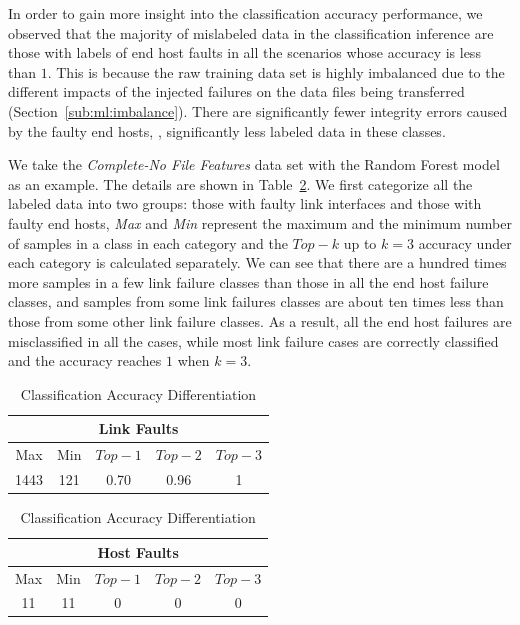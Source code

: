 In order to gain more insight into the classification accuracy performance, we observed that the majority of mislabeled data in the classification inference are those with labels of end host faults in all the scenarios whose accuracy is less than $1$.  This is because the raw training data set is highly imbalanced due to the different impacts of the injected failures on the data files being transferred (Section~\ref{sub:ml:imbalance}). There are significantly fewer integrity errors caused by the faulty end hosts, \ie, significantly less labeled data in these classes. 

We take the {\it Complete-No File Features} data set with the Random Forest model as an example. The details are shown in Table~\ref{tab:class}. We first categorize all the labeled data into two groups: those with faulty link interfaces and those with faulty end hosts, {\it Max} and {\it Min} represent the maximum and the minimum number of samples in a class in each category and the $Top-k$ up to $k=3$ accuracy under each category is calculated separately. We can see that there are a hundred times more samples in a few link failure classes than those in all the end host failure classes, and samples from some link failures classes are about ten times less than those from some other link failure classes. As a result, all the end host failures are misclassified in all the cases, while most link failure cases are correctly classified and the accuracy reaches $1$ when $k=3$.

\begin{table}[!ht]
\caption{Classification Accuracy Differentiation}
\label{tab:class}
\begin{center}
\begin{tabular}{ |c|c|c|c|c| } 
 \hline
  \multicolumn{5}{|c|}{Link Faults} \\
 \hline
 Max & Min & $Top-1$ & $Top-2$ & $Top-3$\\ 
 \hline
 1443 & 121  & 0.70 &  0.96 & 1 \\
 \hline
\end{tabular}

\begin{tabular}{ |c|c|c|c|c|} 
 \hline
\multicolumn{5}{|c|}{Host Faults} \\
 \hline
 Max & Min & $Top-1$ & $Top-2$ & $Top-3$ \\ 
 \hline
11 & 11  & 0 &  0 & 0\\
  \hline
\end{tabular}
\end{center}
\end{table}

